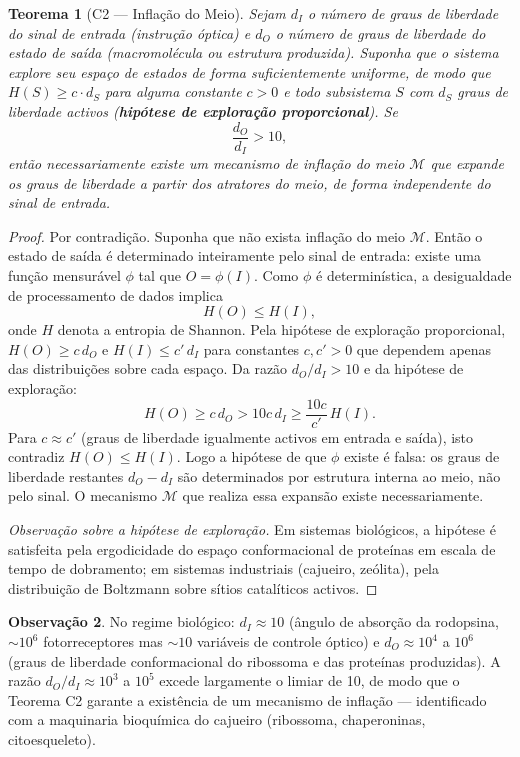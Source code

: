 \documentclass[12pt,a4paper,twoside]{book}
\theoremstyle{plain}
\newtheorem{teorema}{Teorema}[section]
\theoremstyle{definition}
\theoremstyle{definition}
\newtheorem{observacao}[teorema]{Observação}
\begin{document}
\begin{teorema}[C2 — Inflação do Meio]\label{thm:C2}
Sejam $d_{I}$ o número de graus de liberdade do sinal de entrada
(instrução óptica) e $d_{O}$ o número de graus de liberdade do
estado de saída (macromolécula ou estrutura produzida). Suponha que o
sistema explore seu espaço de estados de forma suficientemente uniforme,
de modo que $H(S) \ge c \cdot d_{S}$ para alguma constante $c > 0$ e
todo subsistema $S$ com $d_{S}$ graus de liberdade activos
(\textbf{hipótese de exploração proporcional}). Se
\[
  \frac{d_{O}}{d_{I}} > 10,
\]
então necessariamente existe um mecanismo de inflação do meio $\mathcal{M}$
que expande os graus de liberdade a partir dos atratores do meio, de forma
independente do sinal de entrada.
\end{teorema}

\begin{proof}
Por contradição. Suponha que não exista inflação do meio $\mathcal{M}$.
Então o estado de saída é determinado inteiramente pelo sinal de entrada:
existe uma função mensurável $\phi$ tal que $O = \phi(I)$. Como $\phi$ é
determinística, a desigualdade de processamento de dados implica
\[
  H(O) \le H(I),
\]
onde $H$ denota a entropia de Shannon. Pela hipótese de exploração
proporcional, $H(O) \ge c\,d_{O}$ e $H(I) \le c'\,d_{I}$ para
constantes $c, c' > 0$ que dependem apenas das distribuições sobre
cada espaço. Da razão $d_{O}/d_{I} > 10$ e da hipótese de exploração:
\[
  H(O) \ge c\,d_{O} > 10c\,d_{I} \ge \frac{10c}{c'}\,H(I).
\]
Para $c \approx c'$ (graus de liberdade igualmente activos em entrada e
saída), isto contradiz $H(O) \le H(I)$. Logo a hipótese de que $\phi$
existe é falsa: os graus de liberdade restantes $d_{O} - d_{I}$ são
determinados por estrutura interna ao meio, não pelo sinal. O mecanismo
$\mathcal{M}$ que realiza essa expansão existe necessariamente.

\emph{Observação sobre a hipótese de exploração.} Em sistemas biológicos,
a hipótese é satisfeita pela ergodicidade do espaço conformacional de
proteínas em escala de tempo de dobramento; em sistemas industriais
(cajueiro, zeólita), pela distribuição de Boltzmann sobre sítios
catalíticos activos.
\end{proof}

\begin{observacao}
No regime biológico: $d_{I} \approx 10$ (ângulo de absorção da rodopsina,
$\sim 10^{6}$ fotorreceptores mas $\sim 10$ variáveis de controle óptico) e
$d_{O} \approx 10^{4}$ a $10^{6}$ (graus de liberdade conformacional do
ribossoma e das proteínas produzidas). A razão $d_{O}/d_{I} \approx 10^{3}$
a $10^{5}$ excede largamente o limiar de 10, de modo que o Teorema C2 garante
a existência de um mecanismo de inflação — identificado com a maquinaria
bioquímica do cajueiro (ribossoma, chaperoninas, citoesqueleto).
\end{observacao}
\end{document}
